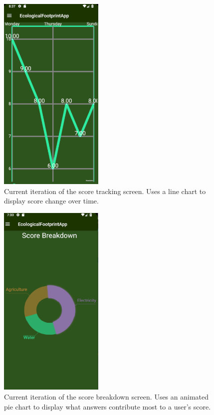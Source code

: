 \documentclass[onecolumn, draftclsnofoot,10pt, compsoc, tikz]{IEEEtran}
\begin{document}
\begin{figure}[h!]
\centering
\includegraphics[width=50mm]{TrackingIter1.png}
\caption{Current iteration of the score tracking screen. Uses a line chart to display score change over time.}
\label{fig:method}
\end{figure}

\begin{figure}[h!]
\centering
\includegraphics[width=50mm]{BreakdownIter1.png}
\caption{Current iteration of the score breakdown screen. Uses an animated pie chart to display what answers contribute most to a user's score.}
\label{fig:method}
\end{figure}
\end{document}
